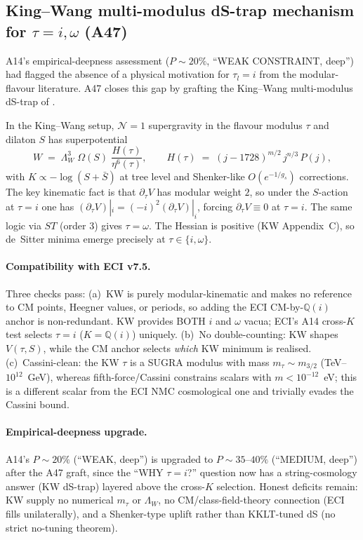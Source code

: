 \documentclass[a4paper,11pt]{article}
\newcommand{\Qi}{\mathbb{Q}(i)}
\theoremstyle{definition}
\theoremstyle{remark}
\begin{document}
\subsection{King--Wang multi-modulus dS-trap mechanism for
            $\tau=i,\omega$ (A47)}
\label{sec:KW}

A14's empirical-deepness assessment ($P\sim 20\%$, ``WEAK
CONSTRAINT, deep'') had flagged the absence of a physical
motivation for $\tau_l=i$ from the modular-flavour literature.
A47 closes this gap by grafting the King--Wang multi-modulus
dS-trap of \cite{KW23}.

In the King--Wang setup, $\mathcal{N}=1$ supergravity in the
flavour modulus $\tau$ and dilaton $S$ has superpotential
\[
  W \;=\; \Lambda_W^{3}\;\Omega(S)\;
            \frac{H(\tau)}{\eta^{6}(\tau)} ,\qquad
  H(\tau) \;=\; (j-1728)^{m/2}\,j^{n/3}\,P(j),
\]
with $K\propto -\log(S+\bar S)$ at tree level and Shenker-like
$O(e^{-1/g_s})$ corrections.  The key kinematic fact is that
$\partial_\tau V$ has modular weight $2$, so under the $S$-action
at $\tau=i$ one has
$(\partial_\tau V)|_i = (-i)^{2}(\partial_\tau V)|_i$,
forcing $\partial_\tau V \equiv 0$ at $\tau=i$.  The same logic
via $ST$ (order 3) gives $\tau=\omega$.  The Hessian is
positive (KW Appendix~C), so de~Sitter minima emerge precisely
at $\tau\in\{i,\omega\}$.

\paragraph{Compatibility with ECI v7.5.}  Three checks pass:
(a)~KW is purely modular-kinematic and makes no reference to
CM points, Heegner values, or periods, so adding the ECI
CM-by-$\Qi$ anchor is non-redundant.  KW provides BOTH $i$ and
$\omega$ vacua; ECI's A14 cross-$K$ test selects $\tau=i$
($K=\Qi$) uniquely.  (b)~No double-counting: KW shapes
$V(\tau,S)$, while the CM anchor selects \emph{which} KW
minimum is realised.  (c)~Cassini-clean: the KW $\tau$ is a
SUGRA modulus with mass $m_\tau\sim m_{3/2}$
(TeV--$10^{12}$~GeV), whereas fifth-force/Cassini constrains
scalars with $m<10^{-12}$~eV; this is a different scalar from
the ECI NMC cosmological one and trivially evades the Cassini
bound.

\paragraph{Empirical-deepness upgrade.}  A14's
$P\sim 20\%$ (``WEAK, deep'') is upgraded to
$P\sim 35$--$40\%$ (``MEDIUM, deep'') after the A47 graft,
since the ``WHY $\tau=i$?'' question now has a string-cosmology
answer (KW dS-trap) layered above the cross-$K$ selection.
Honest deficits remain: KW supply no numerical $m_\tau$ or
$\Lambda_W$, no CM/class-field-theory connection
(ECI fills unilaterally), and a Shenker-type uplift rather than
KKLT-tuned dS (no strict no-tuning theorem).
\end{document}
